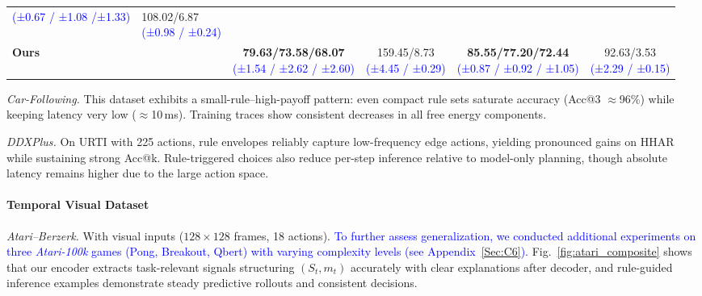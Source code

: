 \documentclass{article} %
\newcommand{\revise}[1]{\textcolor{blue}{#1}}
\begin{document}
\begin{table}[H]
\begin{tabular}{l l c c c c}
{\revise{{\footnotesize (±0.67 / ±1.08 /±1.33)}}} & \makecell[c]{108.02/6.87\\[-1pt]
\revise{{\footnotesize (±0.98 / ±0.24)}}} \\
\textbf{Ours} & &
\makecell[c]{\textbf{79.63/73.58/68.07}\\[-1pt]
\revise{{\footnotesize (±1.54 / ±2.62 / ±2.60)}}}
&
\makecell[c]{159.45/8.73\\[-1pt]
\revise{{\footnotesize (±4.45 / ±0.29)}}}
&
\makecell[c]{\textbf{85.55/77.20/72.44}\\[-1pt]
\revise{{\footnotesize (±0.87 / ±0.92 / ±1.05)}}}
&
\makecell[c]{92.63/3.53\\[-1pt]
\revise{{\footnotesize (±2.29 / ±0.15)}}}
\\
\bottomrule
\end{tabular}
\vspace{-2mm}
\end{table}



\textit{Car-Following.}
This dataset exhibits a small-rule–high-payoff pattern: even compact rule sets saturate accuracy (Acc@3 $\approx$96\%) while keeping latency very low ($\approx$10\,ms). Training traces show consistent decreases in all free energy components. 

\textit{DDXPlus.}
On URTI with 225 actions, rule envelopes reliably capture low-frequency edge actions, yielding pronounced gains on HHAR while sustaining strong Acc@k. Rule-triggered choices also reduce per-step inference relative to model-only planning, though absolute latency remains higher due to the large action space.

\paragraph{Temporal Visual Dataset}

\textit{Atari--Berzerk.}
With visual inputs ($128{\times}128$ frames, 18 actions).
\revise{To further assess generalization, we conducted additional experiments on three \textit{Atari-100k} games (Pong, Breakout, Qbert) with varying complexity levels (see Appendix~\ref{Sec:C6}).}
Fig.~\ref{fig:atari_composite} shows that our encoder extracts task-relevant signals structuring $(S_t,m_t)$ accurately with clear explanations after decoder, and rule-guided inference examples demonstrate steady predictive rollouts and consistent decisions.
\end{document}

